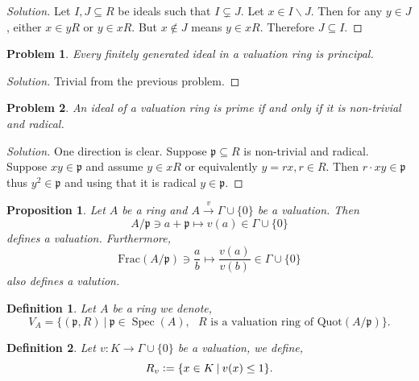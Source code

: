 \documentclass[8pt]{article}
\numberwithin{equation}{section}
\newenvironment{solution}{\begin{proof}[Solution]}{\end{proof}}
\newtheorem{proposition}{Proposition}[section]
\newtheorem{definition}{Definition}[section]
\newtheorem{problem}{Problem}[section]
\DeclareMathOperator{\Spec}{Spec}
\newcommand{\defeq}{\vcentcolon=}
\newcommand{\sep}[0]{\:|\:}
\newcommand{\p}[0]{\mathfrak{p}}
\begin{document}
\begin{solution}
  Let $I,J\subseteq R$ be ideals such that $I\subsetneq J$. Let $x\in I\backslash J$. Then for any $y\in J$, either $x\in yR$ or $y\in xR$. But $x\not\in J$ means $y\in xR$. Therefore $J\subseteq I$.
\end{solution}
\begin{problem}
  Every finitely generated ideal in a valuation ring is principal.
\end{problem}
\begin{solution}
  Trivial from the previous problem.
\end{solution}
\begin{problem}
  An ideal of a valuation ring is prime if and only if it is non-trivial and radical.
\end{problem}
\begin{solution}
  One direction is clear. Suppose $\p\subseteq R$ is non-trivial and radical. Suppose $xy\in\p$ and assume $y\in xR$ or equivalently $y = rx,r\in R$. Then $r\cdot xy\in\p$ thus $y^2\in\p$ and using that it is radical $y\in\p$.
\end{solution}

\begin{proposition}
  Let $A$ be a ring and $A\stackrel{v}{\to}\Gamma\cup\{0\}$ be a valuation. Then 
  \begin{equation*}
    A/\p\ni a+\p\mapsto v(a)\in\Gamma\cup\{0\}
  \end{equation*}
  defines a valuation. Furthermore, 
  \begin{equation*}
    \mathrm{Frac}(A/\p)\ni {\frac a b}\mapsto {\frac {v(a)} {v(b)}}\in\Gamma\cup\{0\}
  \end{equation*}
  also defines a valution.
\end{proposition}

\begin{definition}
  Let $A$ be a ring we denote,
  \begin{equation*}
    V_A = \{(\p,R)\sep \p\in\Spec(A),\text{ $R$ is a valuation ring of $\mathrm{Quot}(A/\p)$}\}.
  \end{equation*}
\end{definition}

\begin{definition}
  Let $v:K\to \Gamma\cup\{0\}$ be a valuation, we define,
  \begin{equation*}
    R_v\defeq\{x\in K\sep v(x)\leq 1\}.
  \end{equation*}
\end{definition}
\end{document}
